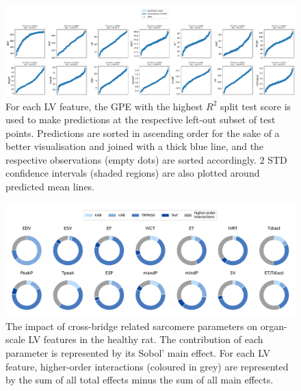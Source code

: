 \begin{figure}[!ht]
    \myfloatalign
    \includegraphics[width=\textwidth]{figures/chapter05/bgpes_vs_bsplit_om.pdf}
    \caption{For each LV feature, the GPE with the highest $R^2$ split test score is used to make predictions at the respective left-out subset of test points. Predictions are sorted in ascending order for the sake of a better visualisation and joined with a thick blue line, and the respective observations (empty dots) are sorted accordingly. $2$ STD confidence intervals (shaded regions) are also plotted around predicted mean lines.}
    \label{fig:omgpes}
\end{figure}


\begin{figure}[!ht]
    \myfloatalign
    \includegraphics[width=\textwidth]{figures/chapter05/gsa_om.pdf}
    \caption{The impact of cross-bridge related sarcomere parameters on organ-scale LV features in the healthy rat. The contribution of each parameter is represented by its Sobol' main effect. For each LV feature, higher-order interactions (coloured in grey) are represented by the sum of all total effects minus the sum of all main effects.}
    \label{fig:omgsa}
\end{figure}



%
%
%
